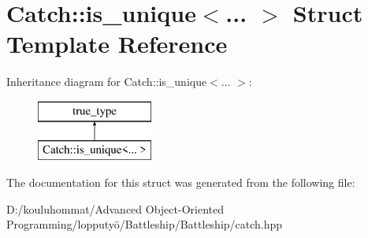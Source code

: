 \hypertarget{struct_catch_1_1is__unique}{}\section{Catch\+:\+:is\+\_\+unique$<$... $>$ Struct Template Reference}
\label{struct_catch_1_1is__unique}
Inheritance diagram for Catch\+:\+:is\+\_\+unique$<$... $>$\+:\begin{figure}[H]
\begin{center}
\leavevmode
\includegraphics[height=2.000000cm]{struct_catch_1_1is__unique}
\end{center}
\end{figure}


The documentation for this struct was generated from the following file\+:\begin{DoxyCompactItemize}
\item 
D\+:/kouluhommat/\+Advanced Object-\/\+Oriented Programming/lopputyö/\+Battleship/\+Battleship/catch.\+hpp\end{DoxyCompactItemize}
